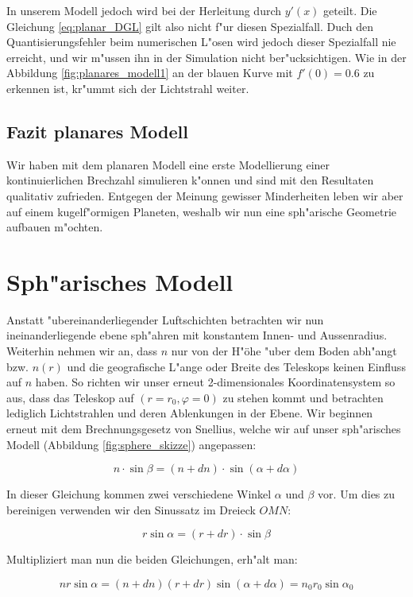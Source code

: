 \begin{refsection}
In unserem Modell jedoch wird bei der Herleitung durch $y'(x)$ geteilt.
Die Gleichung \ref{eq:planar_DGL} gilt also nicht f"ur diesen Spezialfall. 
Duch den Quantisierungsfehler beim numerischen L"osen wird jedoch dieser Spezialfall nie erreicht, und wir m"ussen ihn in der Simulation nicht ber"ucksichtigen.
Wie in der Abbildung \ref{fig:planares_modell1} an der blauen Kurve mit $f'(0) = 0.6$ zu erkennen ist, kr"ummt sich der Lichtstrahl weiter.

\subsection{Fazit planares Modell}
Wir haben mit dem planaren Modell eine erste Modellierung einer kontinuierlichen Brechzahl simulieren k"onnen und sind mit den Resultaten qualitativ zufrieden. 
Entgegen der Meinung gewisser Minderheiten leben wir aber auf einem kugelf"ormigen Planeten, weshalb wir nun eine sph"arische Geometrie aufbauen m"ochten.

\section{Sph"arisches Modell}

Anstatt "ubereinanderliegender Luftschichten betrachten wir nun ineinanderliegende ebene sph"ahren mit konstantem Innen- und Aussenradius.
Weiterhin nehmen wir an, dass $n$ nur von der H"öhe "uber dem Boden abh"angt bzw. $n(r)$ und die geografische L"ange oder Breite des Teleskops keinen Einfluss auf $n$ haben.
So richten wir unser erneut 2-dimensionales Koordinatensystem so aus, dass das Teleskop auf $(r = r_0, \varphi=0)$ zu stehen kommt und betrachten lediglich Lichtstrahlen und deren Ablenkungen in der Ebene.
Wir beginnen erneut mit dem Brechnungsgesetz von Snellius, welche wir auf unser sph"arisches Modell (Abbildung \ref{fig:sphere_skizze}) angepassen: 

$$n \cdot \sin \beta = (n + dn) \cdot \sin(\alpha + d\alpha) $$ 

In dieser Gleichung kommen zwei verschiedene Winkel $\alpha$ und $\beta$ vor. 
Um dies zu bereinigen verwenden wir den Sinussatz im Dreieck $OMN$:

$$r \sin\alpha = (r + dr) \cdot \sin\beta$$

Multipliziert man nun die beiden Gleichungen, erh"alt man:

\begin{equation} \label{eq:sphere_base}
n r \sin \alpha = (n + dn)(r + dr) \sin (\alpha + d\alpha) = n_0 r_0 \sin \alpha_0
\end{equation}


\end{refsection}
